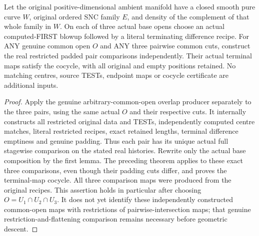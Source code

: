 \begin{theorem}
\label{hir:sharp-actual-curve-retained-common-open-cocycle}
\leanok
Let the original positive-dimensional ambient manifold have a closed smooth
pure curve $W$, original ordered SNC family $E$, and density of the complement
of that whole family in $W$. On each of three actual base opens choose an
actual computed-FIRST blowup followed by a literal terminating difference
recipe. For ANY genuine common open $O$ and ANY three pairwise common cuts,
construct the real restricted padded pair comparisons independently. Their
actual terminal maps satisfy the cocycle, with all original and empty positions
retained. No matching centres, source TESTs, endpoint maps or cocycle certificate
are additional inputs.
\end{theorem}
\begin{proof}
Apply the genuine arbitrary-common-open overlap producer separately to the
three pairs, using the same actual $O$ and their respective cuts. It internally
constructs all restricted original data and TESTs, independently computed
centre matches, literal restricted recipes, exact retained lengths, terminal
difference emptiness and genuine padding. Thus each pair has its unique
actual full stagewise comparison on the stated real histories. Rewrite only
the actual base composition by the first lemma. The preceding theorem applies
to these exact three comparisons, even though their padding cuts differ,
and proves the terminal-map cocycle. All three comparison maps were produced
from the original recipes. This assertion holds in particular after choosing
$O=U_1\cap U_2\cap U_3$. It does not yet identify these independently constructed
common-open maps with restrictions of pairwise-intersection maps; that genuine
restriction-and-flattening comparison remains necessary before geometric
descent.
\end{proof}
